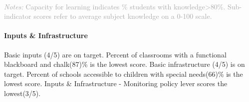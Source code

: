 \documentclass[twocolumn]{article}
\let\oldparagraph\paragraph
\renewcommand{\paragraph}[1]{\oldparagraph{#1}\mbox{}}
\begin{document}
\begin{table}[H]
\\
{\scriptsize
    \textcolor{darkgray}{\textit{Notes:} Capacity for learning indicates \% students with knowledge\textgreater{80\%}. Sub-indicator scores refer to average subject knowledge on a 0-100 scale.}
  }

\end{table}
\raggedbottom

\hypertarget{inputs-infrastructure}{%
\paragraph{\texorpdfstring{\textbf{Inputs \&
Infrastructure}}{Inputs \& Infrastructure}}\label{inputs-infrastructure}}

Basic inputs (4/5) are on target. Percent of classrooms with a
functional blackboard and chalk(87)\% is the lowest score. Basic
infrastructure (4/5) is on target. Percent of schools accessible to
children with special needs(66)\% is the lowest score. Inputs \&
Infrastructure - Monitoring policy lever scores the lowest(3/5).
\end{document}
